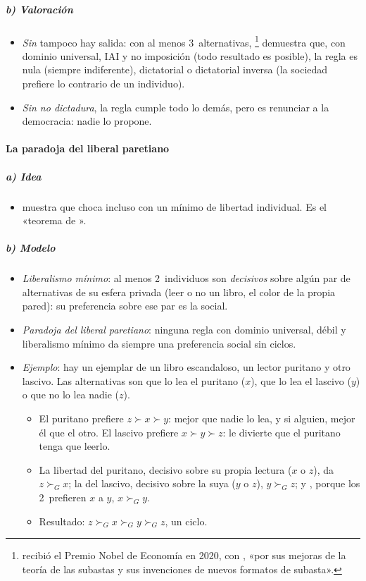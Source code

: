 \documentclass[11pt]{article}
\begin{document}
\subparagraph{b) Valoración}

\begin{itemize}
\item \emph{Sin } tampoco hay salida: con al menos 3~alternativas, \textcite{Wilson1972Social}\footnote{ recibió el Premio Nobel de Economía en 2020, con , «por sus mejoras de la teoría de las subastas y sus invenciones de nuevos formatos de subasta»\nocite{Nobel2020MilgromWilson}.} demuestra que, con dominio universal, IAI y no imposición (todo resultado es posible), la regla es nula (siempre indiferente), dictatorial o dictatorial inversa (la sociedad prefiere lo contrario de un individuo).
\item \emph{Sin no dictadura}, la regla cumple todo lo demás, pero es renunciar a la democracia: nadie lo propone.
\end{itemize}

\paragraph{La paradoja del liberal paretiano}

\subparagraph{a) Idea}

\begin{itemize}
\item \textcite{Sen1970Impossibility} muestra que  choca incluso con un mínimo de libertad individual. Es el «teorema de ».
\end{itemize}

\subparagraph{b) Modelo}

\begin{itemize}
\item \emph{Liberalismo mínimo}: al menos 2~individuos son \emph{decisivos} sobre algún par de alternativas de su esfera privada (leer o no un libro, el color de la propia pared): su preferencia sobre ese par es la social.
\item \emph{Paradoja del liberal paretiano}: ninguna regla con dominio universal,  débil y liberalismo mínimo da siempre una preferencia social sin ciclos.
\item \emph{Ejemplo}: hay un ejemplar de un libro escandaloso, un lector puritano y otro lascivo. Las alternativas son que lo lea el puritano ($x$), que lo lea el lascivo ($y$) o que no lo lea nadie ($z$).
  \begin{itemize}
  \item El puritano prefiere $z\succ x\succ y$: mejor que nadie lo lea, y si alguien, mejor él que el otro. El lascivo prefiere $x\succ y\succ z$: le divierte que el puritano tenga que leerlo.
  \item La libertad del puritano, decisivo sobre su propia lectura ($x$ o $z$), da $z\succ_Gx$; la del lascivo, decisivo sobre la suya ($y$ o $z$), $y\succ_Gz$; y , porque los 2~prefieren $x$ a $y$, $x\succ_Gy$.
  \item Resultado: $z\succ_Gx\succ_Gy\succ_Gz$, un ciclo.
  \end{itemize}
\end{itemize}
\end{document}
